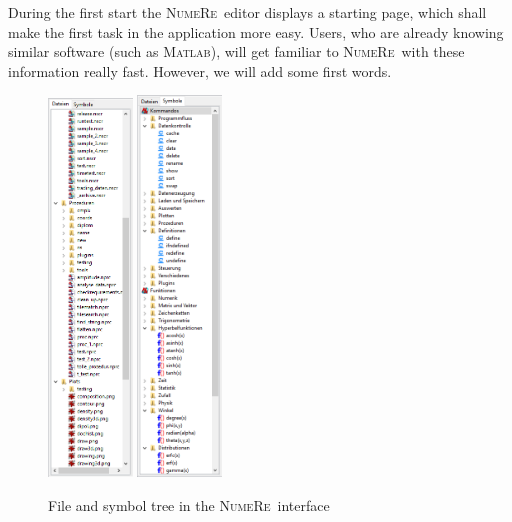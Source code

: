 \documentclass[DIV=14,headsepline,footsepline]{scrbook}
\newcommand{\NR}{\textsc{Nu\-me\-Re}}
\begin{document}
				During the first start the \NR\ editor displays a starting page, which shall make the first task in the application more easy. Users, who are already knowing similar software (such as \textsc{Matlab}), will get familiar to \NR\ with these information really fast. However, we will add some first words.
				\begin{figure}[p]%
					\centering
					\includegraphics[width=0.2\textwidth]{_graphics/filetree.png}\hspace{5em}
					\includegraphics[width=0.2\textwidth]{_graphics/symboltree.png}
					\caption{File and symbol tree in the \NR\ interface}
					\label{fig:trees}
				\end{figure}
				
\end{document}
